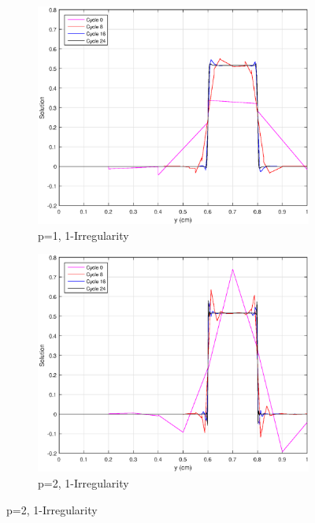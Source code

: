 \begin{figure}
\centering
{
	\begin{subfigure}[b]{0.45\textwidth}
		\centering
		\label{subfig::SL_uniform_ef_me1_irr1}
		\includegraphics[width=\textwidth]{figures/sec_BF/SL_AMR_ME_k1_Irr1.eps}
		\caption{p=1, 1-Irregularity}
	\end{subfigure}
	\hfill
	\begin{subfigure}[b]{0.45\textwidth}
		\centering
		\label{subfig::SL_uniform_ef_me2_irr1}
		\includegraphics[width=\textwidth]{figures/sec_BF/SL_AMR_ME_k2_Irr1.eps}
		\caption{p=2, 1-Irregularity}
	\end{subfigure}
}
\end{figure}
